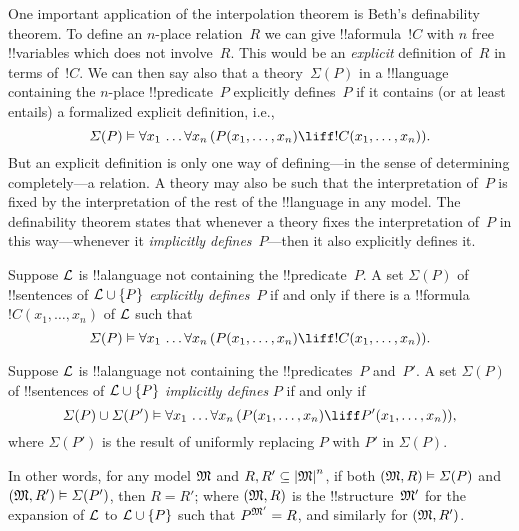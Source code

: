 \documentclass[../../../include/open-logic-section]{subfiles}
\begin{document}


One important application of the interpolation theorem is Beth's
definability theorem.  To define an $n$-place relation~$R$ we can give
!!a{formula}~$!C$ with $n$ free !!{variable}s which does not
involve~$R$. This would be an \emph{explicit} definition of~$R$ in
terms of~$!C$.  We can then say also that a theory~$\Sigma(P)$ in a
!!{language} containing the $n$-place !!{predicate}~$P$ explicitly
defines~$P$ if it contains (or at least entails) a formalized explicit
definition, i.e.,
\[
\Sigma(P) \Entails \lforall[x_1][\dots
  \lforall[x_n][(\Atom{P}{x_1,\dots, x_n} \liff !C(x_1, \dots,
    x_n))]].
\]
But an explicit definition is only one way of defining---in the sense
of determining completely---a relation.  A theory may also be such
that the interpretation of~$P$ is fixed by the interpretation of the
rest of the !!{language} in any model.  The definability theorem
states that whenever a theory fixes the interpretation of~$P$ in this
way---whenever it \emph{implicitly defines}~$P$---then it also
explicitly defines it.

\begin{defn}
Suppose $\Lang{L}$ is !!a{language} not containing the
!!{predicate}~$P$.  A set $\Sigma(P)$ of !!{sentence}s of $\Lang{L}
\cup \{P\}$ \emph{explicitly defines}~$P$ if and only if there is a
!!{formula}~$!C(x_1, \dots, x_n)$ of $\Lang{L}$ such that
\[
\Sigma(P) \Entails \lforall[x_1][\dots
  \lforall[x_n][(\Atom{P}{x_1,\dots, x_n} \liff !C(x_1, \dots,
    x_n))]].
\]
\end{defn}

\begin{defn}
Suppose $\Lang{L}$ is !!a{language} not containing the
!!{predicate}s~$P$ and~$P'$.  A set $\Sigma(P)$ of !!{sentence}s of
$\Lang{L} \cup \{P\}$ \emph{implicitly defines} $P$ if and only if
\[
\Sigma(P) \cup \Sigma(P') \Entails \lforall[x_1][\dots
  \lforall[x_n][(\Atom{P}{x_1,\dots, x_n} \liff \Atom{P'}{x_1,\dots,
      x_n})]],
\]
where $\Sigma(P')$ is the result of uniformly replacing $P$ with $P'$
in $\Sigma(P)$.
\end{defn}

In other words, for any model $\Struct{M}$ and $R, R' \subseteq
\Domain{M}^n$, if both $\Expan{M}{R} \Entails \Sigma(P)$ and
$\Expan{M}{R'} \Entails \Sigma(P')$, then $R=R'$; where
$\Expan{M}{R}$ is the !!{structure}~$\Struct{M'}$ for the
expansion of $\Lang{L}$ to $\Lang{L} \cup \{P\}$ such that
$\Assign{P}{M'} = R$, and similarly for $\Expan{M}{R'}$.
\end{document}
